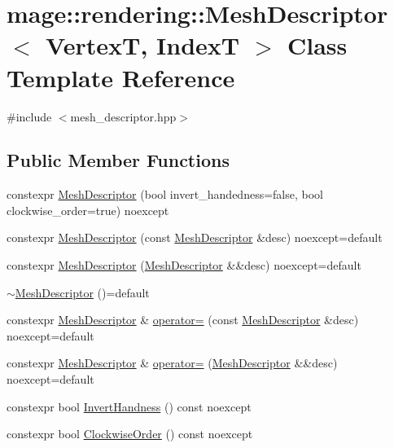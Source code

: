 \hypertarget{classmage_1_1rendering_1_1_mesh_descriptor}{}\section{mage\+:\+:rendering\+:\+:Mesh\+Descriptor$<$ VertexT, IndexT $>$ Class Template Reference}
\label{classmage_1_1rendering_1_1_mesh_descriptor}


{\ttfamily \#include $<$mesh\+\_\+descriptor.\+hpp$>$}

\subsection*{Public Member Functions}
\begin{DoxyCompactItemize}
\item 
constexpr \hyperlink{classmage_1_1rendering_1_1_mesh_descriptor_a1b0ebe38d5591dda224370a7533f0c13}{Mesh\+Descriptor} (bool invert\+\_\+handedness=false, bool clockwise\+\_\+order=true) noexcept
\item 
constexpr \hyperlink{classmage_1_1rendering_1_1_mesh_descriptor_ad46be4da19cfa33f0731f371b7ebbe43}{Mesh\+Descriptor} (const \hyperlink{classmage_1_1rendering_1_1_mesh_descriptor}{Mesh\+Descriptor} \&desc) noexcept=default
\item 
constexpr \hyperlink{classmage_1_1rendering_1_1_mesh_descriptor_a929e3b4b29e421f921e5d17d0a382275}{Mesh\+Descriptor} (\hyperlink{classmage_1_1rendering_1_1_mesh_descriptor}{Mesh\+Descriptor} \&\&desc) noexcept=default
\item 
\hyperlink{classmage_1_1rendering_1_1_mesh_descriptor_a0948d279801d1b4eb7eb5dca8b0f86ea}{$\sim$\+Mesh\+Descriptor} ()=default
\item 
constexpr \hyperlink{classmage_1_1rendering_1_1_mesh_descriptor}{Mesh\+Descriptor} \& \hyperlink{classmage_1_1rendering_1_1_mesh_descriptor_a9db3890980a6e0c7ccc315067bc55853}{operator=} (const \hyperlink{classmage_1_1rendering_1_1_mesh_descriptor}{Mesh\+Descriptor} \&desc) noexcept=default
\item 
constexpr \hyperlink{classmage_1_1rendering_1_1_mesh_descriptor}{Mesh\+Descriptor} \& \hyperlink{classmage_1_1rendering_1_1_mesh_descriptor_a044577019dcdb37ed0d1d919d9d33887}{operator=} (\hyperlink{classmage_1_1rendering_1_1_mesh_descriptor}{Mesh\+Descriptor} \&\&desc) noexcept=default
\item 
constexpr bool \hyperlink{classmage_1_1rendering_1_1_mesh_descriptor_a0fa7557aa67c69a7978f965bdc913686}{Invert\+Handness} () const noexcept
\item 
constexpr bool \hyperlink{classmage_1_1rendering_1_1_mesh_descriptor_a71ea285cfb0bc3f748038de570e9084e}{Clockwise\+Order} () const noexcept
\end{DoxyCompactItemize}
